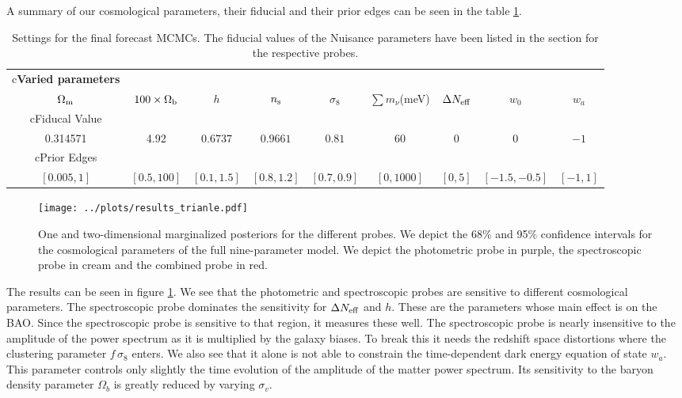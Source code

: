 \documentclass[../main.tex]{subfiles}
\begin{document}
A summary of our cosmological parameters, their fiducial and their prior edges can be seen in the table \ref{tab:fiducial_forecast}. 
\begin{table}[t]
    \renewcommand{\arraystretch}{1.2}
        \caption{Settings for the final forecast MCMCs. The fiducial values of the Nuisance parameters have been listed in the section for the respective probes. }
        \centering
        \begin{tabular}{ccccccccc}
        \hline
        \rowcolor{cyan} \multicolumn{9} {c}{{\bf{Varied parameters}}}\\ 
     \multicolumn{1}{c}{$\Omega_{\rm m}$} & \multicolumn{1}{c}{$100\times\Omega_{\rm b}$} & \multicolumn{1}{c}{$h$} & \multicolumn{1}{c}{$n_{\rm s}$} & \multicolumn{1}{c}{$\sigma_{8}$} & \multicolumn{1}{c}{$\sum m_\nu$(meV)} & \multicolumn{1}{c}{$\Delta N_\mathrm{eff}$} & \multicolumn{1}{c}{$w_0$} & \multicolumn{1}{c}{$w_a$} \\
      \hline
      \rowcolor{gray} \multicolumn{9} {c}{{{Fiducal Value}}}\\
            0.314571 & 4.92 & $0.6737$ & $0.9661$ & $0.81$ & $60$ & $0 $& $0$ & $-1$ \\
            \hline
            \rowcolor{gray} \multicolumn{9} {c}{{{Prior Edges}}}\\
            $[0.005,1]$&$[0.5,100]$&$[0.1,1.5]$&$[0.8,1.2]$&$[0.7,0.9]$&$[0,1000]$&$[0,5]$&$[-1.5,-0.5]$&$[-1,1]$
        \end{tabular}
        \label{tab:fiducial_forecast}
    \end{table}
    \begin{figure}
        \centering
        \caption{One and two-dimensional marginalized posteriors for the different \Euclid probes. We depict the 68\% and 95\% confidence intervals for the cosmological parameters of the full nine-parameter model. We depict the photometric probe in purple, the spectroscopic probe in cream and the combined probe in red.}
        \texttt{[image: ../plots/results\_trianle.pdf]}
        \label{fig:results_trianle}
    \end{figure}
    The results can be seen in figure \ref{fig:results_trianle}. We see that the photometric and spectroscopic probes are sensitive to different cosmological parameters. The spectroscopic probe dominates the sensitivity for $\Delta N_\mathrm{eff}$ and $h$. These are the parameters whose main effect is on the BAO. Since the spectroscopic probe is sensitive to that region, it measures these well. The spectroscopic probe is nearly insensitive to the amplitude of the power spectrum as it is multiplied by the galaxy biases. To break this it needs the redshift space distortions where the clustering parameter $f\,\sigma_8$ enters. We also see that it alone is not able to constrain the time-dependent dark energy equation of state $w_a$. This parameter controls only slightly the time evolution of the amplitude of the matter power spectrum. Its sensitivity to the baryon density parameter $\Omega_b$ is greatly reduced by varying $\sigma_v$.\\
\end{document}
